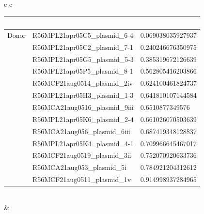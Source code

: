 \documentclass[conference]{IEEEtran}
\begin{document}
\begin{table}[]
\begin{tabular}{ c c}
\begin{tabular}{l l l}
			& \ &\ \\
			\hline
			Donor & R56MPL21apr05C5\_plasmid\_6-4	&	0.069038035927937	\\
						&R56MPL21apr05C2\_plasmid\_7-1	&	0.240246676350975	\\
						&R56MPL21apr05G5\_plasmid\_5-3	&	0.385319672126639	\\
						&R56MPL21apr05P5\_plasmid\_8-1	&	0.562805416203866	\\
						&R56MCF21aug0514\_plasmid\_2iv	&	0.624100461824737	\\
						&R56MPL21apr05H3\_plasmid\_1-3	&	0.641810107144584	\\
						&R56MCA21aug0516\_plasmid\_9iii	&	0.6510877349576	\\
						&R56MPL21apr05K6\_plasmid\_2-4	&	0.661026070503639	\\
						&R56MCA21aug056\_plasmid\_6iii	&	0.687419348128837	\\
						&R56MPL21apr05K4\_plasmid\_4-1	&	0.709966645467017	\\
						&R56MCF21aug0519\_plasmid\_3ii	&	0.752070920633736	\\
						&R56MCA21aug053\_plasmid\_5i	&	0.784921204312612	\\
						&R56MCF21aug0511\_plasmid\_1v	&	0.914998937284965	\\
					\end{tabular}\\
\hline
& \ \\
	\begin{minipage}{.4\textwidth}

\end{minipage}
\end{tabular}
\end{table}
\end{document}
